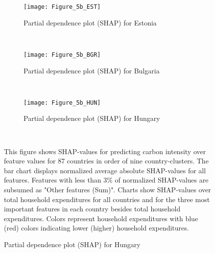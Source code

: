 \begin{figure}[ht!]
     \centering
     \begin{subfigure}[b]{\textwidth}
         \centering
         \caption{Partial dependence plot (SHAP) for Estonia}
         \label{fig:5b_EST}
         \texttt{[image: Figure\_5b\_EST]}      
     \end{subfigure}
    \\
    \vspace{0.5cm}
     \begin{subfigure}[b]{\textwidth}
         \centering
         \caption{Partial dependence plot (SHAP) for Bulgaria}
         \label{fig:5b_BGR}
         \texttt{[image: Figure\_5b\_BGR]}
     \end{subfigure}
    \\
    \vspace{0.5cm}
     \begin{subfigure}[b]{1\textwidth}
         \centering
         \caption{Partial dependence plot (SHAP) for Hungary}
         \label{fig:5b_HUN}
         \texttt{[image: Figure\_5b\_HUN]}
     \end{subfigure}
     \\
     \vspace{0.5cm}
        \begin{subcaption2}
     This figure shows SHAP-values for predicting carbon intensity over feature values for 87 countries in order of nine country-clusters. The bar chart displays normalized average absolute SHAP-values for all features. Features with less than 3\% of normalized SHAP-values are subsumed as "Other features (Sum)". Charts show SHAP-values over total household expenditures for all countries and for the three most important features in each country besides total household expenditures. Colors represent household expenditures with blue (red) colors indicating lower (higher) household expenditures.
     \end{subcaption2}
     \end{figure}
     

